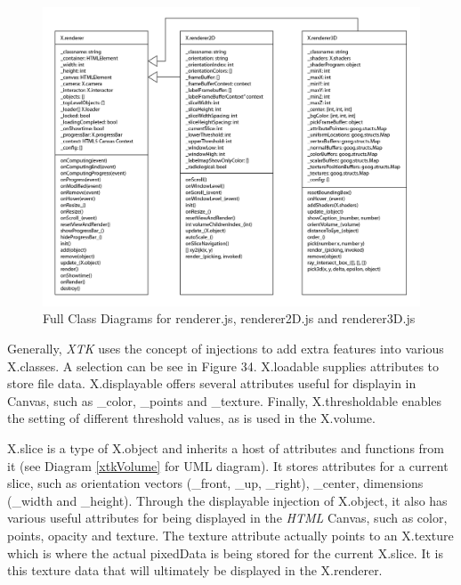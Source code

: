 \documentclass[a4paper,11pt,twoside]{article}
\begin{document}
\begin{figure}[ht!]
\centering
\includegraphics[width=165mm]{graphics/xtkUML_01.png}
\caption{Full Class Diagrams for renderer.js, renderer2D.js and renderer3D.js}
\label{fig:UIdesign1}
\end{figure}


Generally, \textit{XTK} uses the concept of injections to add extra features into various X.classes. A selection can be see in Figure 34. X.loadable supplies attributes to store file data. X.displayable offers several attributes useful for displayin in Canvas, such as \_color, \_points and \_texture. Finally, X.thresholdable enables the setting of different threshold values, as is used in the X.volume.

X.slice is a type of X.object and inherits a host of attributes and functions from it (see Diagram \ref{xtkVolume} for UML diagram). It stores attributes for a current slice, such as orientation vectors (\_front, \_up, \_right), \_center, dimensions (\_width and \_height). Through the displayable injection of X.object, it also has various useful attributes for being displayed in the \textit{HTML} Canvas, such as color, points, opacity and texture. The texture attribute actually points to an X.texture which is where the actual pixedData is being stored for the current X.slice. It is this texture data that will ultimately be displayed in the X.renderer.
\end{document}
